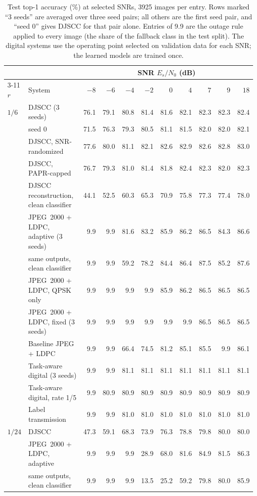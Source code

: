 \documentclass[conference]{IEEEtran}
\begin{document}
\begin{table}[t]
\caption{Test top-1 accuracy (\%) at selected SNRs, 3925 images per entry. Rows marked ``3 seeds'' are averaged over three seed pairs; all others are the first seed pair, and ``seed 0'' gives DJSCC for that pair alone. Entries of 9.9 are the outage rule applied to every image (the share of the fallback class in the test split). The digital systems use the operating point selected on validation data for each SNR; the learned models are trained once.}
\label{tab:results}
\centering
\begin{tabular}{llrrrrrrrrr}
\toprule
& & \multicolumn{9}{c}{SNR $E_s/N_0$ (dB)} \\
\cmidrule(l){3-11}
$r$ & System & $-8$ & $-6$ & $-4$ & $-2$ & $0$ & $4$ & $7$ & $9$ & $18$ \\
\midrule
$1/6$ & DJSCC (3 seeds) & 76.1 & 79.1 & 80.8 & 81.4 & 81.6 & 82.1 & 82.3 & 82.3 & 82.4 \\
 & \quad seed 0 & 71.5 & 76.3 & 79.3 & 80.5 & 81.1 & 81.5 & 82.0 & 82.0 & 82.1 \\
 & DJSCC, SNR-randomized & 77.6 & 80.0 & 81.1 & 82.1 & 82.6 & 82.9 & 82.6 & 82.8 & 83.0 \\
 & DJSCC, PAPR-capped & 76.7 & 79.3 & 81.0 & 81.4 & 81.8 & 82.4 & 82.3 & 82.0 & 82.3 \\
 & DJSCC reconstruction, clean classifier & 44.1 & 52.5 & 60.3 & 65.3 & 70.9 & 75.8 & 77.3 & 77.4 & 78.0 \\
 & JPEG~2000 + LDPC, adaptive (3 seeds) & 9.9 & 9.9 & 81.6 & 83.2 & 85.9 & 86.2 & 86.5 & 84.3 & 86.6 \\
 & \quad same outputs, clean classifier & 9.9 & 9.9 & 59.2 & 78.2 & 84.4 & 86.4 & 87.5 & 85.2 & 87.6 \\
 & JPEG~2000 + LDPC, QPSK only & 9.9 & 9.9 & 9.9 & 9.9 & 85.9 & 86.2 & 86.5 & 86.5 & 86.5 \\
 & JPEG~2000 + LDPC, fixed (3 seeds) & 9.9 & 9.9 & 9.9 & 9.9 & 9.9 & 9.9 & 86.5 & 86.5 & 86.5 \\
 & Baseline JPEG + LDPC & 9.9 & 9.9 & 66.4 & 74.5 & 81.2 & 85.1 & 85.5 & 9.9 & 86.1 \\
 & Task-aware digital (3 seeds) & 9.9 & 9.9 & 81.1 & 81.1 & 81.1 & 81.1 & 81.1 & 81.1 & 81.1 \\
 & Task-aware digital, rate 1/5 & 9.9 & 80.9 & 80.9 & 80.9 & 80.9 & 80.9 & 80.9 & 80.9 & 80.9 \\
 & Label transmission & 9.9 & 9.9 & 81.0 & 81.0 & 81.0 & 81.0 & 81.0 & 81.0 & 81.0 \\
\midrule
$1/24$ & DJSCC & 47.3 & 59.1 & 68.3 & 73.9 & 76.3 & 78.8 & 79.8 & 80.0 & 80.0 \\
 & JPEG~2000 + LDPC, adaptive & 9.9 & 9.9 & 9.9 & 28.9 & 68.0 & 81.6 & 84.9 & 81.5 & 86.3 \\
 & \quad same outputs, clean classifier & 9.9 & 9.9 & 9.9 & 13.5 & 25.2 & 59.2 & 79.8 & 80.0 & 85.9 \\
\bottomrule
\end{tabular}
\end{table}
\end{document}
